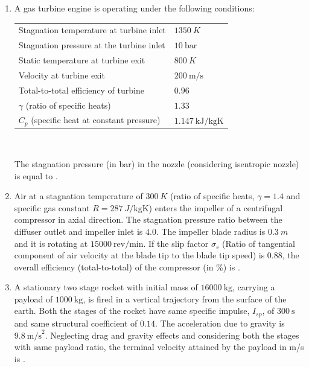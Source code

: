 \documentclass[journal]{IEEEtran}
\begin{document}
\begin{enumerate}
\item \quad  A gas turbine engine is operating under the following conditions: 
\begin{center}
\begin{tabular}{ll}
Stagnation temperature at turbine inlet & $1350 \ K$ \\
Stagnation pressure at the turbine inlet & $10 \ \text{bar}$ \\
Static temperature at turbine exit & $800 \ K$ \\
Velocity at turbine exit & $200 \ \text{m/s}$ \\
Total-to-total efficiency of turbine & $0.96$ \\
$\gamma$ (ratio of specific heats) & $1.33$ \\
$C_p$ (specific heat at constant pressure) & $1.147 \ \text{kJ/kgK}$ \\
\end{tabular} \\[6pt]
\end{center}
The stagnation pressure (in bar) in the nozzle (considering isentropic nozzle) is equal to \underline{\hspace{1.5cm}}.

 \hfill{}
 
\item
Air at a stagnation temperature of $300 \ K$ (ratio of specific heats, $\gamma = 1.4$ and specific gas constant $R = 287 \ J/\text{kgK}$) enters the impeller of a centrifugal compressor in axial direction. The stagnation pressure ratio between the diffuser outlet and impeller inlet is $4.0$. The impeller blade radius is $0.3 \ m$ and it is rotating at $15000 \ \text{rev/min}$. If the slip factor $\sigma_s$ (Ratio of tangential component of air velocity at the blade tip to the blade tip speed) is $0.88$, the overall efficiency (total-to-total) of the compressor (in \%) is \underline{\hspace{1.5cm}}. 

\hfill{}

\item 
A stationary two stage rocket with initial mass of $16000 \ \text{kg}$, carrying a payload of $1000 \ \text{kg}$, is fired in a vertical trajectory from the surface of the earth. Both the stages of the rocket have same specific impulse, $I_{sp}$, of $300 \ \text{s}$ and same structural coefficient of $0.14$. The acceleration due to gravity is $9.8 \ \text{m/s}^2$. Neglecting drag and gravity effects and considering both the stages with same payload ratio, the terminal velocity attained by the payload in m/s is \underline{\hspace{1.5cm}}. 


\end{enumerate}
\end{document}
